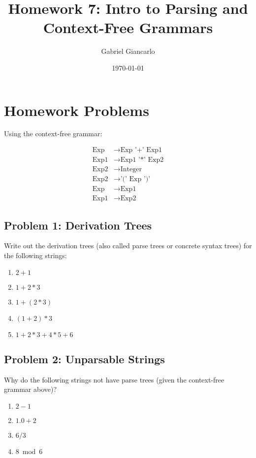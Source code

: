 \documentclass[12pt]{article}
\title{Homework 7: Intro to Parsing and Context-Free Grammars}
\author{Gabriel Giancarlo}
\date{\today}
\begin{document}
\maketitle

\section*{Homework Problems}

Using the context-free grammar:

\begin{align}
\text{Exp} &\to \text{Exp '+' Exp1} \\
\text{Exp1} &\to \text{Exp1 '*' Exp2} \\
\text{Exp2} &\to \text{Integer} \\
\text{Exp2} &\to \text{'(' Exp ')'} \\
\text{Exp} &\to \text{Exp1} \\
\text{Exp1} &\to \text{Exp2}
\end{align}

\subsection*{Problem 1: Derivation Trees}

Write out the derivation trees (also called parse trees or concrete syntax trees) for the following strings:

\begin{enumerate}[label=(\alph*)]
    \item $2+1$
    \item $1+2*3$
    \item $1+(2*3)$
    \item $(1+2)*3$
    \item $1+2*3+4*5+6$
\end{enumerate}

\subsection*{Problem 2: Unparsable Strings}

Why do the following strings not have parse trees (given the context-free grammar above)?

\begin{enumerate}[label=(\alph*)]
    \item $2-1$
    \item $1.0+2$
    \item $6/3$
    \item $8 \bmod 6$
\end{enumerate}
\end{document}
